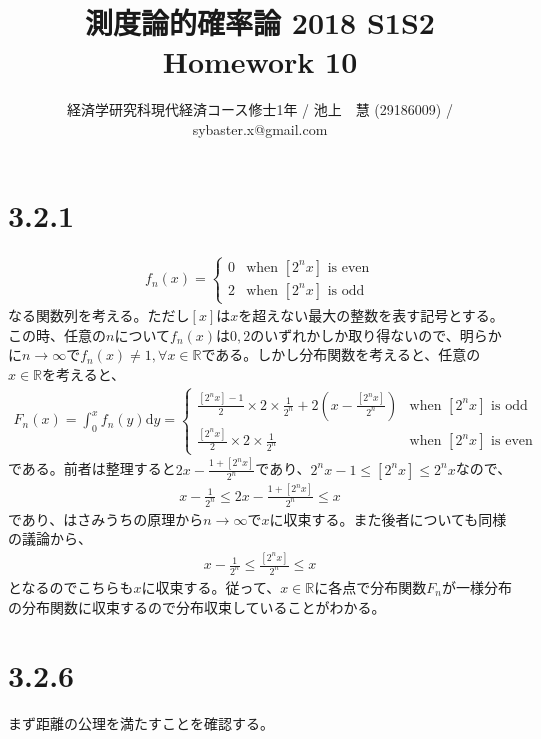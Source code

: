 \documentclass{article}
\begin{document}
\title{測度論的確率論 2018 S1S2 \\ 
Homework 10}
\author{経済学研究科現代経済コース修士1年 / 池上　慧 (29186009) / sybaster.x@gmail.com}
\maketitle

\section{3.2.1}
\begin{align*}
	f_n(x) = \begin{cases} 0 & \text{when $\left[ 2^n x \right]$ is even}\\[8pt]
	2 & \text{when $\left[ 2^n x \right]$ is odd}
	\end{cases}
\end{align*}
なる関数列を考える。ただし$\left[ x \right]$は$x$を超えない最大の整数を表す記号とする。この時、任意の$n$について$f_n(x)$は$0,2$のいずれかしか取り得ないので、明らかに$n \to \infty$で$f_n(x) \neq 1 ,\forall x \in \mathbb{R}$である。しかし分布関数を考えると、任意の$x \in \mathbb{R}$を考えると、
\begin{align*}
	F_n(x) = \int_0^x f_n(y) \mathrm{d}y = \begin{cases} \frac{\left[ 2^n x \right] - 1}{2} \times 2 \times \frac{1}{2^n} + 2\left( x - \frac{\left[ 2^n x \right]}{2^n} \right) & \text{when $\left[ 2^n x \right]$ is odd} \\[8pt]
	\frac{\left[ 2^n x \right] }{2} \times 2 \times \frac{1}{2^n}  & \text{when $\left[ 2^n x \right]$ is even}
	\end{cases}
\end{align*}
である。前者は整理すると$2x - \frac{1 + \left[ 2^n x \right]}{2^n}$であり、$2^n x - 1 \leq \left[ 2^n x \right] \leq 2^n x$なので、
\begin{align*}
	x - \frac{1}{2^n}\leq 2x - \frac{1 + \left[ 2^n x \right]}{2^n} \leq x
\end{align*}
であり、はさみうちの原理から$n \to \infty$で$x$に収束する。また後者についても同様の議論から、
\begin{align*}
	x-\frac{1}{2^n} \leq \frac{\left[ 2^n x \right]}{2^n} \leq x
\end{align*}
となるのでこちらも$x$に収束する。従って、$x \in \mathbb{R}$に各点で分布関数$F_n$が一様分布の分布関数に収束するので分布収束していることがわかる。

\section{3.2.6}
まず距離の公理を満たすことを確認する。
\end{document}
